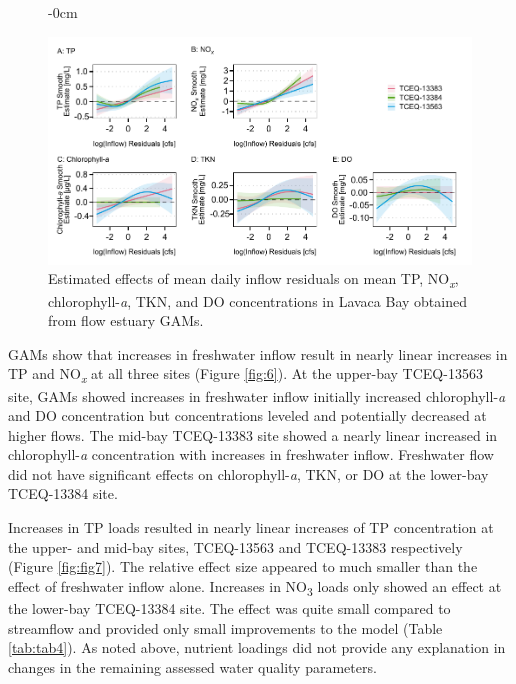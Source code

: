 \documentclass[water,article,submit,oneauthor]{Definitions/mdpi}
\begin{document}
\begin{figure}\begin{adjustwidth}{-\extralength}{0cm}

{\centering \includegraphics[width=1\linewidth]{Schramm-Manuscript-2023_files/figure-latex/fig6-1} 

}

\end{adjustwidth}\caption[Estimated effects of mean daily inflow residuals on mean TP, NO\textsubscript{\emph{x}}, chlorophyll-\emph{a}, TKN, and DO concentrations in Lavaca Bay obtained from flow estuary GAMs]{Estimated effects of mean daily inflow residuals on mean TP, NO\textsubscript{\emph{x}}, chlorophyll-\emph{a}, TKN, and DO concentrations in Lavaca Bay obtained from flow estuary GAMs.}\label{fig:fig6}
\end{figure}

GAMs show that increases in freshwater inflow result in nearly linear
increases in TP and NO\textsubscript{\emph{x}} at all three sites
(Figure \ref{fig:6}). At the upper-bay TCEQ-13563 site, GAMs showed
increases in freshwater inflow initially increased chlorophyll-\emph{a}
and DO concentration but concentrations leveled and potentially
decreased at higher flows. The mid-bay TCEQ-13383 site showed a nearly
linear increased in chlorophyll-\emph{a} concentration with increases in
freshwater inflow. Freshwater flow did not have significant effects on
chlorophyll-\emph{a}, TKN, or DO at the lower-bay TCEQ-13384 site.

Increases in TP loads resulted in nearly linear increases of TP
concentration at the upper- and mid-bay sites, TCEQ-13563 and TCEQ-13383
respectively (Figure \ref{fig:fig7}). The relative effect size appeared
to much smaller than the effect of freshwater inflow alone. Increases in
NO\textsubscript{3} loads only showed an effect at the lower-bay
TCEQ-13384 site. The effect was quite small compared to streamflow and
provided only small improvements to the model (Table \ref{tab:tab4}). As
noted above, nutrient loadings did not provide any explanation in
changes in the remaining assessed water quality parameters.
\end{document}
